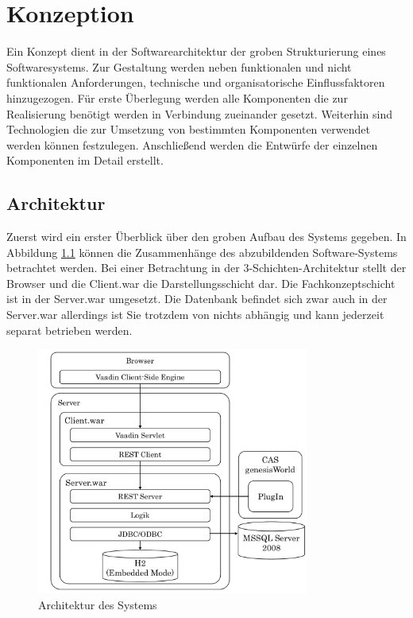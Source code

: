 
\chapter{Konzeption}

Ein Konzept dient in der Softwarearchitektur der groben Strukturierung eines Softwaresystems. Zur Gestaltung werden neben funktionalen und nicht funktionalen Anforderungen, technische und organisatorische Einflussfaktoren hinzugezogen. Für erste Überlegung werden alle Komponenten die zur Realisierung benötigt werden in Verbindung zueinander gesetzt. Weiterhin sind Technologien die zur Umsetzung von bestimmten Komponenten verwendet werden können festzulegen. Anschließend werden die Entwürfe der einzelnen Komponenten im Detail erstellt.  

\section{Architektur}

Zuerst wird ein erster Überblick über den groben Aufbau des Systems gegeben. In Abbildung \ref{konzept_architektur} können die Zusammenhänge des abzubildenden Software-Systems betrachtet werden. Bei einer Betrachtung in der 3-Schichten-Architektur stellt der Browser und die Client.war die Darstellungsschicht dar. Die Fachkonzeptschicht ist in der Server.war umgesetzt. Die Datenbank befindet sich zwar auch in der Server.war allerdings ist Sie trotzdem von nichts abhängig und kann jederzeit separat betrieben werden.

\begin{figure}[htbp]
\centering
  \includegraphics[width=0.8\textwidth, width=0.8\textwidth]{pics/Konzept_architektur.pdf}
\caption{Architektur des Systems}
\label{konzept_architektur}
\end{figure} 

